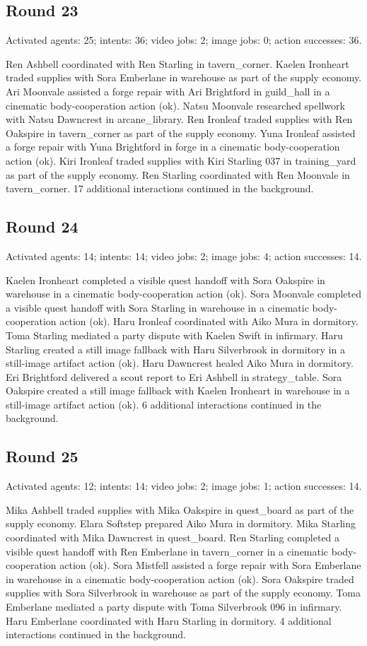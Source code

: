 \documentclass[11pt,a4paper]{article}
\begin{document}
\subsection{Round 23}
Activated agents: 25; intents: 36; video jobs: 2; image jobs: 0; action successes: 36.

Ren Ashbell coordinated with Ren Starling in tavern\_corner. Kaelen Ironheart traded supplies with Sora Emberlane in warehouse as part of the supply economy. Ari Moonvale assisted a forge repair with Ari Brightford in guild\_hall in a cinematic body-cooperation action (ok). Natsu Moonvale researched spellwork with Natsu Dawncrest in arcane\_library. Ren Ironleaf traded supplies with Ren Oakspire in tavern\_corner as part of the supply economy. Yuna Ironleaf assisted a forge repair with Yuna Brightford in forge in a cinematic body-cooperation action (ok). Kiri Ironleaf traded supplies with Kiri Starling 037 in training\_yard as part of the supply economy. Ren Starling coordinated with Ren Moonvale in tavern\_corner. 17 additional interactions continued in the background.

\subsection{Round 24}
Activated agents: 14; intents: 14; video jobs: 2; image jobs: 4; action successes: 14.

Kaelen Ironheart completed a visible quest handoff with Sora Oakspire in warehouse in a cinematic body-cooperation action (ok). Sora Moonvale completed a visible quest handoff with Sora Starling in warehouse in a cinematic body-cooperation action (ok). Haru Ironleaf coordinated with Aiko Mura in dormitory. Toma Starling mediated a party dispute with Kaelen Swift in infirmary. Haru Starling created a still image fallback with Haru Silverbrook in dormitory in a still-image artifact action (ok). Haru Dawncrest healed Aiko Mura in dormitory. Eri Brightford delivered a scout report to Eri Ashbell in strategy\_table. Sora Oakspire created a still image fallback with Kaelen Ironheart in warehouse in a still-image artifact action (ok). 6 additional interactions continued in the background.

\subsection{Round 25}
Activated agents: 12; intents: 14; video jobs: 2; image jobs: 1; action successes: 14.

Mika Ashbell traded supplies with Mika Oakspire in quest\_board as part of the supply economy. Elara Softstep prepared Aiko Mura in dormitory. Mika Starling coordinated with Mika Dawncrest in quest\_board. Ren Starling completed a visible quest handoff with Ren Emberlane in tavern\_corner in a cinematic body-cooperation action (ok). Sora Mistfell assisted a forge repair with Sora Emberlane in warehouse in a cinematic body-cooperation action (ok). Sora Oakspire traded supplies with Sora Silverbrook in warehouse as part of the supply economy. Toma Emberlane mediated a party dispute with Toma Silverbrook 096 in infirmary. Haru Emberlane coordinated with Haru Starling in dormitory. 4 additional interactions continued in the background.
\end{document}
